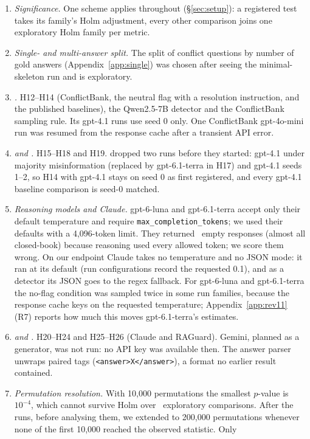 \begin{enumerate}[leftmargin=*,itemsep=1pt,topsep=2pt]
duplicate.
\item \emph{Significance.} One scheme applies throughout (\S\ref{sec:setup}): a registered test takes its
family's Holm adjustment, every other comparison joins one exploratory Holm family per metric.
\item \emph{Single- and multi-answer split.} The split of conflict questions by number of gold answers
(Appendix~\ref{app:single}) was chosen after seeing the minimal-skeleton run and is exploratory.
\item \emph{.} H12--H14 (ConflictBank, the neutral flag with a resolution instruction, and the published
baselines), the Qwen2.5-7B detector and the ConflictBank sampling rule. Its gpt-4.1 runs use seed 0 only. One
ConflictBank gpt-4o-mini run was resumed from the response cache after a transient API error.
\item \emph{ and .} H15--H18 and H19.  dropped two  runs before they started: gpt-4.1 under
majority misinformation (replaced by gpt-6.1-terra in H17) and gpt-4.1 seeds 1--2, so H14 with gpt-4.1 stays on
seed 0 as first registered, and every gpt-4.1 baseline comparison is seed-0 matched.
\item \emph{Reasoning models and Claude.} gpt-6-luna and gpt-6.1-terra accept only their default temperature and require
\texttt{max\_completion\_tokens}; we used their defaults with a 4,096-token limit. They returned
\Nempty\ empty responses (almost all closed-book) because reasoning used every allowed token; we score them wrong. On our
endpoint Claude takes no temperature and no JSON mode: it ran at its default (run configurations record the requested
0.1), and as a detector its JSON goes to the regex fallback. For gpt-6-luna and gpt-6.1-terra the no-flag condition was
sampled twice in some run families, because the response cache keys on the requested temperature;
Appendix~\ref{app:rev11} (R7) reports how much this moves gpt-6.1-terra's estimates.
\item \emph{ and .} H20--H24 and H25--H26 (Claude and RAGuard). Gemini, planned as a generator, was not run:
no API key was available then. The answer parser unwraps paired tags (\texttt{<answer>X</answer>}), a format no
earlier result contained.
\item \emph{Permutation resolution.} With 10,000 permutations the smallest $p$-value is $10^{-4}$, which cannot
survive Holm over \nExploratory\ exploratory comparisons. After the  runs, before analysing them, we
extended to 200,000 permutations whenever none of the first 10,000 reached the observed statistic. Only

\end{enumerate}
